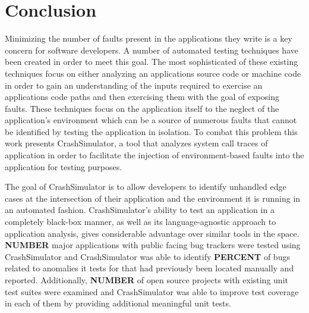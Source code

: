 \section{Conclusion}

    Minimizing the number of faults present in the applications they write is a key concern for software developers. A
    number of automated testing techniques have been created in order to meet this goal. The most sophisticated of these
    existing techniques focus on either analyzing an applications source code or machine code in order to gain an
    understanding of the inputs required to exercise an applications code paths and then exercising them with the goal
    of exposing faults. These techniques focus on the application itself to the neglect of the application's environment
    which can be a source of numerous faults that cannot be identified by testing the application in isolation. To
    combat this problem this work presents CrashSimulator, a tool that analyzes system call traces of application in
    order to facilitate the injection of environment-based faults into the application for testing purposes.

    The goal of CrashSimulator is to allow developers to identify unhandled edge cases at the intersection of their
    application and the environment it is running in an automated fashion. CrashSimulator's ability to test an
    application in a completely black-box manner, as well as its language-agnostic approach to application analysis,
    gives considerable advantage over similar tools in the space. \textbf{NUMBER} major applications with public facing
    bug trackers were tested using CrashSimulator and CrashSimulator was able to identify \textbf{PERCENT} of bugs
    related to anomalies it tests for that had previously been located manually and reported. Additionally,
    \textbf{NUMBER} of open source projects with existing unit test suites were examined and CrashSimulator was able to
    improve test coverage in each of them by providing additional meaningful unit tests.


